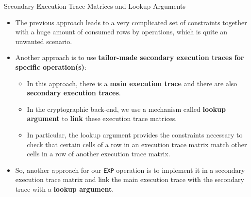 \begin{frame} {Secondary Execution Trace Matrices and Lookup Arguments}
\begin{itemize}
\item The previous approach leads to a very complicated set of constraints together with a huge amount
of consumed rows by operations, which is quite an unwanted scenario.
\item Another approach is to use \textbf{tailor-made secondary execution traces for specific operation(s)}:
  \begin{itemize}
  \item In this approach, there is a \textbf{main execution trace} and there are also \textbf{secondary execution traces}.
  \item In the cryptographic back-end, we use a mechanism called \textbf{lookup argument} to \textbf{link} these execution trace matrices.
  \item In particular, the lookup argument provides the constraints necessary to check that certain cells of a row in an execution trace matrix match other cells in a row of another execution trace matrix.
  \end{itemize}
\item So, another approach for our \texttt{EXP} operation is to implement it in a secondary execution trace matrix
and link the main execution trace with the secondary trace with a \textbf{lookup argument}.
\end{itemize}
\end{frame}





